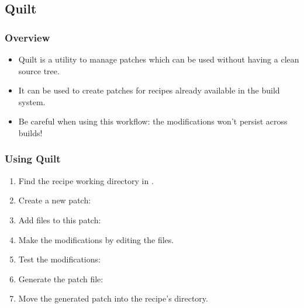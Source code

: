 \subsection{Quilt}

\begin{frame}
  \frametitle{Overview}
  \begin{itemize}
    \item Quilt is a utility to manage patches which can be used
      without having a clean source tree.
    \item It can be used to create patches for recipes already
      available in the build system.
    \item Be careful when using this workflow: the modifications won't
      persist across builds!
  \end{itemize}
\end{frame}

\begin{frame}
  \frametitle{Using Quilt}
  \begin{enumerate}
    \item Find the recipe working directory in
      .
    \item Create a new  patch:
    \item Add files to this patch: 
    \item Make the modifications by editing the files.
    \item Test the modifications:
    \item Generate the patch file: 
    \item Move the generated patch into the recipe's directory.
  \end{enumerate}
\end{frame}
